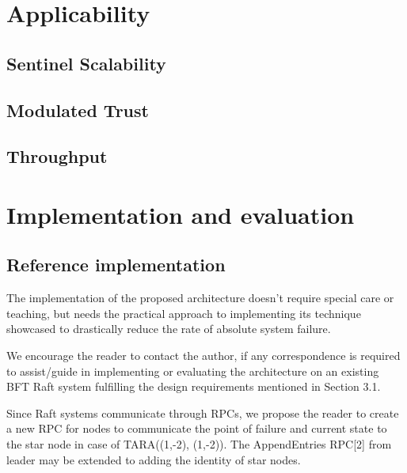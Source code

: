 \documentclass[]{article}
\begin{document}

\section{Applicability}

\subsection{Sentinel Scalability}

\subsection{Modulated Trust}

\subsection{Throughput}

\section{Implementation and evaluation}
\subsection{Reference implementation}
The implementation of the proposed architecture doesn’t require special care or teaching, but needs the practical approach to implementing its technique showcased to drastically reduce the rate of absolute system failure. 

We encourage the reader to contact the author, if any correspondence is required to assist/guide in implementing or evaluating the architecture on an existing BFT Raft system fulfilling the design requirements mentioned in Section 3.1.

Since Raft systems communicate through RPCs, we propose the reader to create a new RPC for nodes to communicate the point of failure and current state to the star node in case of TARA((1,-2), (1,-2)). The AppendEntries RPC[2] from leader may be extended to adding the identity of star nodes.
\end{document}
